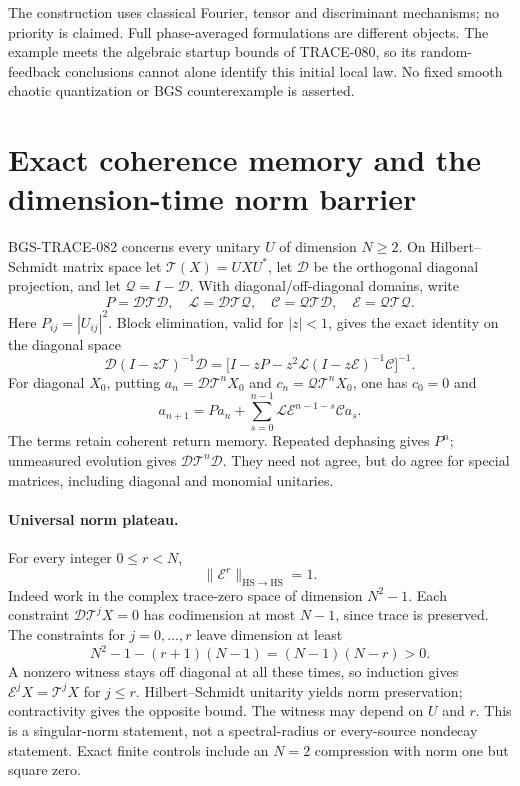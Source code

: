 The construction uses classical Fourier, tensor and discriminant
mechanisms; no priority is claimed.  Full phase-averaged formulations
\cite{Tanner2001USE,GnutzmannAltland2004Graphs} are different objects.
The example meets the algebraic startup bounds of TRACE-080, so its
random-feedback conclusions cannot alone identify this initial local
law.  No fixed smooth chaotic quantization or BGS counterexample is
asserted.

\section{Exact coherence memory and the dimension-time norm barrier}
\label{sec:coherence-memory-20261014}

BGS-TRACE-082 concerns every unitary \(U\) of dimension \(N\ge2\).
On Hilbert--Schmidt matrix space let
\(\mathcal T(X)=UXU^*\), let \(\mathcal D\) be the orthogonal
diagonal projection, and let \(\mathcal Q=I-\mathcal D\).  With
diagonal/off-diagonal domains, write
\[
P=\mathcal D\mathcal T\mathcal D,\quad
\mathcal L=\mathcal D\mathcal T\mathcal Q,\quad
\mathcal C=\mathcal Q\mathcal T\mathcal D,\quad
\mathcal E=\mathcal Q\mathcal T\mathcal Q .
\]
Here \(P_{ij}=|U_{ij}|^2\).  Block elimination, valid for \(|z|<1\),
gives the exact identity on the diagonal space
\[
\mathcal D(I-z\mathcal T)^{-1}\mathcal D
 =\bigl[I-zP-z^2\mathcal L
      (I-z\mathcal E)^{-1}\mathcal C\bigr]^{-1}.
\]
For diagonal \(X_0\), putting \(a_n=\mathcal D\mathcal T^nX_0\)
and \(c_n=\mathcal Q\mathcal T^nX_0\), one has \(c_0=0\) and
\[
a_{n+1}=Pa_n+
 \sum_{s=0}^{n-1}\mathcal L\mathcal E^{n-1-s}\mathcal C a_s .
\]
The terms retain coherent return memory.  Repeated dephasing gives
\(P^n\); unmeasured evolution gives
\(\mathcal D\mathcal T^n\mathcal D\).  They need not agree, but do
agree for special matrices, including diagonal and monomial unitaries.

\paragraph{Universal norm plateau.}
For every integer \(0\le r<N\),
\[
\|\mathcal E^r\|_{\mathrm{HS}\to\mathrm{HS}}=1 .
\]
Indeed work in the complex trace-zero space of dimension \(N^2-1\).
Each constraint \(\mathcal D\mathcal T^jX=0\) has codimension at most
\(N-1\), since trace is preserved.  The constraints for
\(j=0,\ldots,r\) leave dimension at least
\[
N^2-1-(r+1)(N-1)=(N-1)(N-r)>0 .
\]
A nonzero witness stays off diagonal at all these times, so induction
gives \(\mathcal E^jX=\mathcal T^jX\) for \(j\le r\).
Hilbert--Schmidt unitarity yields norm preservation; contractivity
gives the opposite bound.  The witness may depend on \(U\) and \(r\).
This is a singular-norm statement, not a spectral-radius or
every-source nondecay statement.  Exact finite controls include an
\(N=2\) compression with norm one but square zero.


